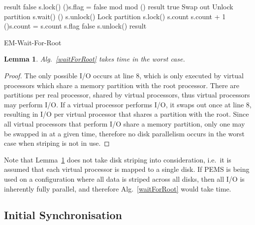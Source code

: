 \documentclass[12pt]{carletoncsthesis}
\newtheorem{lemma}[thm]{Lemma}
\begin{document}
\begin{algorithm}[h]
	\BlankLine
	result  false\;
	s.lock()\;
	\If(){s.flag = false}{
		 mod  \;
		 mod  \;
		\If(){}{
			\;
			result  true\;
			Swap out\;
			Unlock partition\;
		}
		s.wait() \;
		\If(){}{
			\;
			s.unlock() \;
			Lock partition\;
			s.lock()\;
		}
	}
	s.count  s.count + 1\;
	\If(){s.count = }{
		\;
		s.count \;
		s.flag  false\;
	}
	s.unlock()\;
	\Return result\;
	\caption{\sc EM-Wait-For-Root}
	\label{waitForRoot}
\end{algorithm}

\begin{lemma}
\label{wait-root-io}
Alg.~\ref{waitForRoot} takes  time in the worst case.
\end{lemma}
\begin{proof}
The only possible I/O occurs at line 8, which is only executed by virtual
processors which share a memory partition with the root processor.  There are
 partitions per real processor, shared by  virtual processors,
thus  virtual processors may perform I/O.  If a virtual
processor performs I/O, it swaps out once at line 8, resulting in  I/O per
virtual processor that shares a partition with the root.  Since all virtual
processors that perform I/O share a memory partition, only one may be swapped
in at a given time, therefore no disk parallelism occurs in the worst case
when striping is not in use.
\end{proof}

Note that Lemma~\ref{wait-root-io} does not take disk striping into
consideration, i.e.\ it is assumed that each virtual processor is mapped to
a single disk.  If PEMS is being used on a configuration where all data
is striped across all disks, then all I/O is inherently fully parallel,
and therefore Alg.~\ref{waitForRoot} would take  time.

\subsection{Initial Synchronisation}
\end{document}
